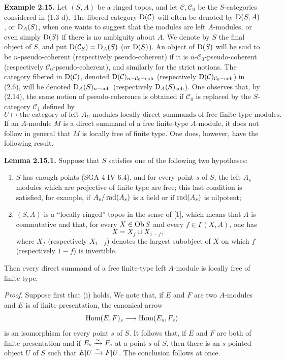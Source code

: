 \documentclass[11pt]{article}
\begin{document}
\textbf{Example 2.15.} Let \((S,A)\) be a ringed topos, and let \(\mathcal C,\mathcal C_0\) be the \(S\)-categories considered in (1.3 d). The fibered category \(\mathrm D(\mathcal C)\) will often be denoted by \(\mathrm D(S,A)\), or \(\mathrm D_A(S)\), when one wants to suggest that the modules are left \(A\)-modules, or even simply \(\mathrm D(S)\) if there is no ambiguity about \(A\). We denote by \(S\) the final object of \(S\), and put \(\mathrm D(\mathcal C_S)=\mathrm D_A(S)\) (or \(\mathrm D(S)\)). An object of \(\mathrm D(S)\) will be said to be \(n\)-pseudo-coherent (respectively pseudo-coherent) if it is \(n\)-\(\mathcal C_0\)-pseudo-coherent (respectively \(\mathcal C_0\)-pseudo-coherent), and similarly for the strict notions. The category fibered in \(\mathrm D(\mathcal C)\), denoted \(\mathrm D(\mathcal C)_{n-\mathcal C_0-\mathrm{coh}}\) (respectively \(\mathrm D(\mathcal C)_{\mathcal C_0-\mathrm{coh}}\)) in (2.6), will be denoted \(\mathrm D_A(S)_{n-\mathrm{coh}}\) (respectively \(\mathrm D_A(S)_{\mathrm{coh}}\)). One observes that, by (2.14), the same notion of pseudo-coherence is obtained if \(\mathcal C_0\) is replaced by the \(S\)-category \(\mathcal C_1\) defined by
\[
  U\longmapsto \text{the category of left }A_U\text{-modules locally direct summands of free finite-type modules}.
\]
If an \(A\)-module \(M\) is a direct summand of a free finite-type \(A\)-module, it does not follow in general that \(M\) is locally free of finite type. One does, however, have the following result.

\textbf{Lemma 2.15.1.} Suppose that \(S\) satisfies one of the following two hypotheses:
\begin{enumerate}[label=(\roman*)]
\item \(S\) has enough points (SGA 4 IV 6.4), and for every point \(s\) of \(S\), the left \(A_s\)-modules which are projective of finite type are free; this last condition is satisfied, for example, if \(A_s/\operatorname{rad}(A_s)\) is a field or if \(\operatorname{rad}(A_s)\) is nilpotent;
\item \((S,A)\) is a ``locally ringed'' topos in the sense of [1], which means that \(A\) is commutative and that, for every \(X\in\operatorname{Ob} S\) and every \(f\in\Gamma(X,A)\), one has
\[
  X=X_f\cup X_{1-f},
\]
where \(X_f\) (respectively \(X_{1-f}\)) denotes the largest subobject of \(X\) on which \(f\) (respectively \(1-f\)) is invertible.
\end{enumerate}
Then every direct summand of a free finite-type left \(A\)-module is locally free of finite type.

\emph{Proof.} Suppose first that (i) holds. We note that, if \(E\) and \(F\) are two \(A\)-modules and \(E\) is of finite presentation, the canonical arrow
\[
  \operatorname{Hom}(E,F)_s\longrightarrow \operatorname{Hom}(E_s,F_s)
\]
is an isomorphism for every point \(s\) of \(S\). It follows that, if \(E\) and \(F\) are both of finite presentation and if \(E_s\xrightarrow{\sim} F_s\) at a point \(s\) of \(S\), then there is an \(s\)-pointed object \(U\) of \(S\) such that \(E|U\xrightarrow{\sim} F|U\). The conclusion follows at once.
\end{document}
